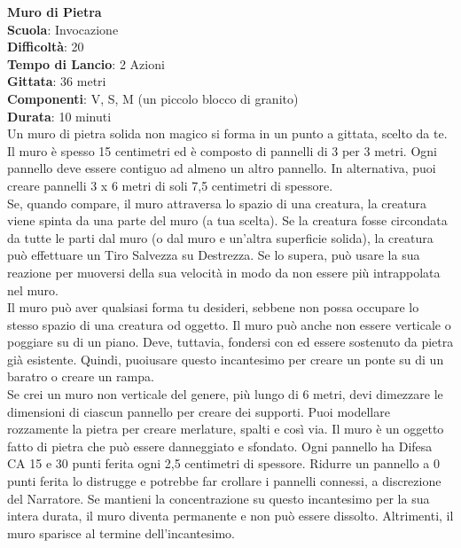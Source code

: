 \begin{multicols}{2}
\medskip\textbf{Muro di Pietra}\\
\textbf{Scuola}: Invocazione\\
\textbf{Difficoltà}:  20\\
\textbf{Tempo di Lancio}: 2 Azioni\\
\textbf{Gittata}: 36 metri\\
\textbf{Componenti}: V, S, M (un piccolo blocco di granito)\\
\textbf{Durata}: 10 minuti\\
Un muro di pietra solida non magico si forma in un punto a gittata, scelto da te. Il muro è spesso 15 centimetri ed è composto di pannelli di 3 per 3 metri. Ogni pannello deve essere contiguo ad almeno un altro pannello. In alternativa, puoi creare pannelli 3 x 6 metri di soli 7,5 centimetri di spessore.\\
Se, quando compare, il muro attraversa lo spazio di una creatura, la creatura viene spinta da una parte del muro (a tua scelta). Se la creatura fosse circondata da tutte le parti dal muro (o dal muro e un'altra superficie solida), la creatura può effettuare un Tiro Salvezza su Destrezza. Se lo supera, può usare la sua reazione per muoversi della sua velocità in modo da non essere più intrappolata nel muro.\\
Il muro può aver qualsiasi forma tu desideri, sebbene non possa occupare lo stesso spazio di una creatura od oggetto. Il muro può anche non essere verticale o poggiare su di un piano. Deve, tuttavia, fondersi con ed essere sostenuto da pietra già esistente. Quindi, puoiusare questo  incantesimo per creare un ponte su di un baratro o creare un rampa.\\
Se crei un muro non verticale del genere, più lungo di 6 metri, devi dimezzare le dimensioni di ciascun pannello per creare dei supporti. Puoi modellare rozzamente la pietra per creare merlature, spalti e così via. Il muro è un oggetto fatto di pietra che può essere danneggiato e sfondato. Ogni pannello ha Difesa CA 15 e 30 punti ferita ogni 2,5 centimetri di spessore. Ridurre un pannello a 0 punti ferita lo distrugge e potrebbe far crollare i pannelli connessi, a discrezione del Narratore. Se mantieni la concentrazione su questo incantesimo per la sua intera durata, il muro diventa permanente e non può essere dissolto. Altrimenti, il muro sparisce al termine dell'incantesimo.


\end{multicols}
